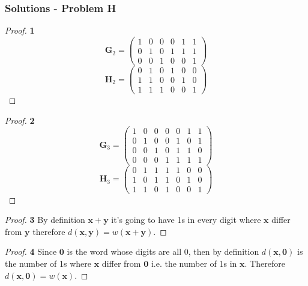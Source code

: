 \documentclass[11pt]{article}
\begin{document}
	\subsubsection*{Solutions - Problem H}
	\begin{proof}{\textbf{1}}
		\[\bm{G}_2=	
		\begin{pmatrix}
			1 & 0 & 0 & 0 & 1 & 1 \\
			0 & 1 & 0 & 1 & 1 & 1 \\
			0 & 0 & 1 & 0 & 0 & 1
		\end{pmatrix}\]
		\[\bm{H}_2=	
		\begin{pmatrix}
			0 & 1 & 0 & 1 & 0 & 0 \\
			1 & 1 & 0 & 0 & 1 & 0 \\
			1 & 1 & 1 & 0 & 0 & 1
		\end{pmatrix}\]
	\end{proof}
	\begin{proof}{\textbf{2}}
		\[\bm{G}_3=	
		\begin{pmatrix}
			1 & 0 & 0 & 0 & 0 & 1 & 1 \\
			0 & 1 & 0 & 0 & 1 & 0 & 1 \\
			0 & 0 & 1 & 0 & 1 & 1 & 0 \\
			0 & 0 & 0 & 1 & 1 & 1 & 1
		\end{pmatrix}\]
		\[\bm{H}_3=	
		\begin{pmatrix}
			0 & 1 & 1 & 1 & 1 & 0 & 0 \\
			1 & 0 & 1 & 1 & 0 & 1 & 0 \\
			1 & 1 & 0 & 1 & 0 & 0 & 1 
		\end{pmatrix}\]
	\end{proof}
	\begin{proof}{\textbf{3}}
		By definition $\bm{x}+\bm{y}$ it's going to have 1s in every digit where $\bm{x}$ differ from $\bm{y}$ therefore $d(\bm{x},\bm{y})=w(\bm{x+y})$.
	\end{proof}
	\begin{proof}{\textbf{4}}
		Since $\bm{0}$ is the word whose digits are all 0, then by definition $d(\bm{x,0})$ is the number of 1s where $\bm{x}$ differ from $\bm{0}$ i.e. the number of 1s in $\bm{x}$. Therefore $d(\bm{x,0}) = w(\bm{x})$.
	\end{proof}
\end{document}
